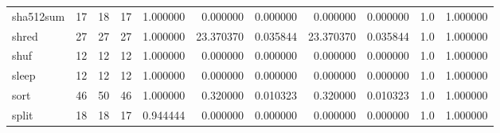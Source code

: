 \begin{longtable}{lrrrrrrrrrr}
sha512sum &                                      17 &                 18 &                                17 &                                   1.000000 &                               0.000000 &                                     0.000000 &                          0.000000 &                                0.000000 &                                1.0 &                                           1.000000 \\
shred     &                                      27 &                 27 &                                27 &                                   1.000000 &                              23.370370 &                                     0.035844 &                         23.370370 &                                0.035844 &                                1.0 &                                           1.000000 \\
shuf      &                                      12 &                 12 &                                12 &                                   1.000000 &                               0.000000 &                                     0.000000 &                          0.000000 &                                0.000000 &                                1.0 &                                           1.000000 \\
sleep     &                                      12 &                 12 &                                12 &                                   1.000000 &                               0.000000 &                                     0.000000 &                          0.000000 &                                0.000000 &                                1.0 &                                           1.000000 \\
sort      &                                      46 &                 50 &                                46 &                                   1.000000 &                               0.320000 &                                     0.010323 &                          0.320000 &                                0.010323 &                                1.0 &                                           1.000000 \\
split     &                                      18 &                 18 &                                17 &                                   0.944444 &                               0.000000 &                                     0.000000 &                          0.000000 &                                0.000000 &                                1.0 &                                           1.000000 \\

\end{longtable}
